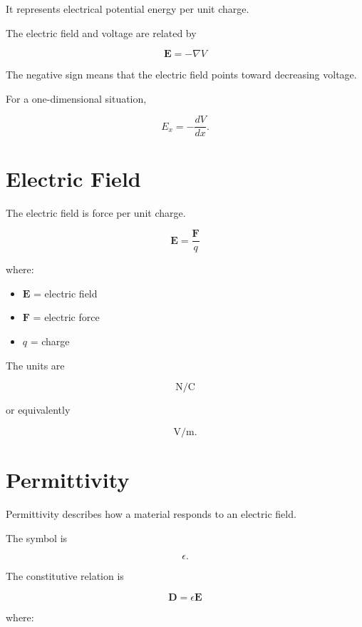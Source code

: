 \documentclass[11pt]{article}
\newcommand{\vect}[1]{\mathbf{#1}}
\begin{document}
It represents electrical potential energy per unit charge.

The electric field and voltage are related by

\[
\boxed{
\vect{E}
=
-\nabla V
}
\]

The negative sign means that the electric field points toward decreasing voltage.

For a one-dimensional situation,

\[
E_x=-\frac{dV}{dx}.
\]



\section{Electric Field}

The electric field is force per unit charge.

\[
\boxed{
\vect{E}
=
\frac{\vect{F}}{q}
}
\]

where:

\begin{itemize}
    \item $\vect{E}$ = electric field
    \item $\vect{F}$ = electric force
    \item $q$ = charge
\end{itemize}

The units are

\[
\mathrm{N/C}
\]

or equivalently

\[
\mathrm{V/m}.
\]



\section{Permittivity}

Permittivity describes how a material responds to an electric field.

The symbol is

\[
\epsilon.
\]

The constitutive relation is

\[
\boxed{
\vect{D}
=
\epsilon\vect{E}
}
\]

where:
\end{document}
